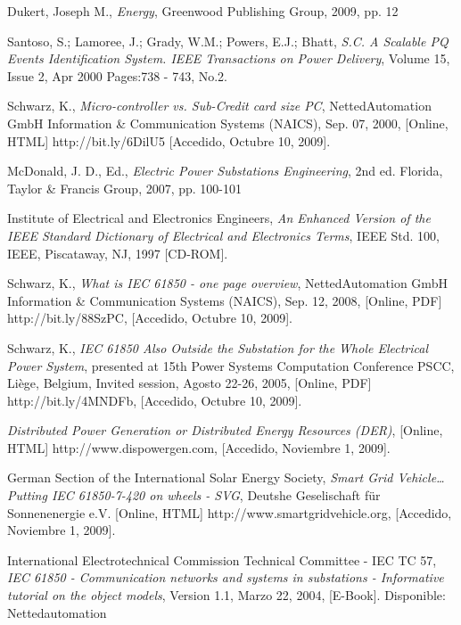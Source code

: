 \documentclass[conference,twocolumn]{IEEEtran}
\begin{document}
\begin{thebibliography}{1}

		Dukert, Joseph M., \emph{Energy}, Greenwood Publishing Group, 2009, pp. 12

	 	Santoso, S.; Lamoree, J.; Grady, W.M.; Powers, E.J.; Bhatt, \emph{S.C. A Scalable PQ Events Identification System. IEEE Transactions on Power Delivery}, Volume 15, Issue 2, Apr 2000 Pages:738 - 743, No.2.

		Schwarz, K., \emph{Micro-controller vs. Sub-Credit card size PC}, 
	         NettedAutomation GmbH Information \& Communication Systems (NAICS), Sep. 07, 2000, [Online, HTML]
    	         http://bit.ly/6DilU5
	        [Accedido, Octubre 10, 2009].
                   
		McDonald, J. D., Ed., \emph{Electric Power Substations Engineering}, 2nd ed. Florida, Taylor \& Francis Group, 2007, pp. 100-101

		Institute of Electrical and Electronics Engineers, \emph{An Enhanced Version of the IEEE Standard Dictionary of Electrical and Electronics Terms}, IEEE Std. 100, IEEE, Piscataway, NJ, 1997 [CD-ROM].

		Schwarz, K., \emph{What is IEC 61850 - one page overview}, NettedAutomation GmbH Information \& Communication Systems (NAICS), Sep. 12,  2008, [Online, PDF] http://bit.ly/88SzPC, [Accedido, Octubre 10, 2009].

		Schwarz, K., \emph{IEC 61850 Also Outside the Substation for the Whole Electrical Power System}, presented at 15th Power Systems Computation Conference PSCC, Liège, Belgium, Invited session, Agosto 22-26, 2005,  [Online, PDF]  	http://bit.ly/4MNDFb, [Accedido, Octubre 10, 2009].

	 	\emph{Distributed Power Generation or Distributed Energy Resources (DER)}, [Online, HTML]  http://www.dispowergen.com, [Accedido, Noviembre 1, 2009].

		 German Section of the International Solar Energy Society, \emph{Smart Grid Vehicle… Putting IEC 61850-7-420 on wheels - SVG}, Deutshe Geselischaft für Sonnenenergie e.V. [Online, HTML] http://www.smartgridvehicle.org,  [Accedido, Noviembre 1, 2009].

		International Electrotechnical Commission Technical Committee - IEC TC 57, \emph{IEC 61850 - Communication networks and systems in substations - Informative tutorial on the object models}, Version 1.1, Marzo 22, 2004, [E-Book]. Disponible: 		Nettedautomation


\end{thebibliography}
\end{document}
